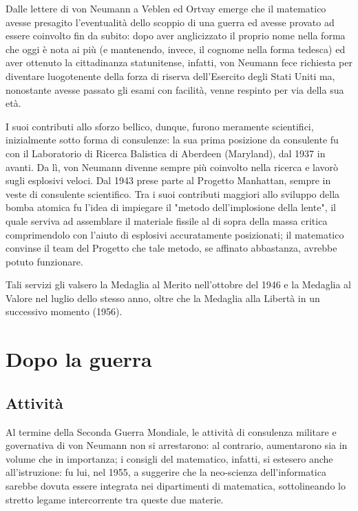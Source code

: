 \documentclass[a4paper, 12pt]{article}
\begin{document}
Dalle lettere di von Neumann a Veblen ed Ortvay emerge che il matematico avesse presagito l'eventualità dello scoppio di una guerra ed avesse provato ad essere coinvolto fin da subito: dopo aver anglicizzato il proprio nome nella forma che oggi è nota ai più (e mantenendo, invece, il cognome nella forma tedesca) ed aver ottenuto la cittadinanza statunitense, infatti, von Neumann fece richiesta per diventare luogotenente della forza di riserva dell'Esercito degli Stati Uniti ma, nonostante avesse passato gli esami con facilità, venne respinto per via della sua età.

I suoi contributi allo sforzo bellico, dunque, furono meramente scientifici, inizialmente sotto forma di consulenze: la sua prima posizione da consulente fu con il Laboratorio di Ricerca Balistica di Aberdeen (Maryland), dal 1937 in avanti. Da lì, von Neumann divenne sempre più coinvolto nella ricerca e lavorò sugli esplosivi veloci. Dal 1943 prese parte al Progetto Manhattan, sempre in veste di consulente scientifico.
Tra i suoi contributi maggiori allo sviluppo della bomba atomica fu l'idea di impiegare il "metodo dell'implosione della lente", il quale serviva ad assemblare il materiale fissile al di sopra della massa critica comprimendolo con l'aiuto di esplosivi accuratamente posizionati; il matematico convinse il team del Progetto che tale metodo, se affinato abbastanza, avrebbe potuto funzionare.

Tali servizi gli valsero la Medaglia al Merito nell'ottobre del 1946 e la Medaglia al Valore nel luglio dello stesso anno, oltre che la Medaglia alla Libertà in un successivo momento (1956).

\section{Dopo la guerra}

\subsection{Attività}

Al termine della Seconda Guerra Mondiale, le attività di consulenza militare e governativa di von Neumann non si arrestarono: al contrario, aumentarono sia in volume che in importanza; i consigli del matematico, infatti, si estesero anche all'istruzione: fu lui, nel 1955, a suggerire che la neo-scienza dell'informatica sarebbe dovuta essere integrata nei dipartimenti di matematica, sottolineando lo stretto legame intercorrente tra queste due materie.
\end{document}
